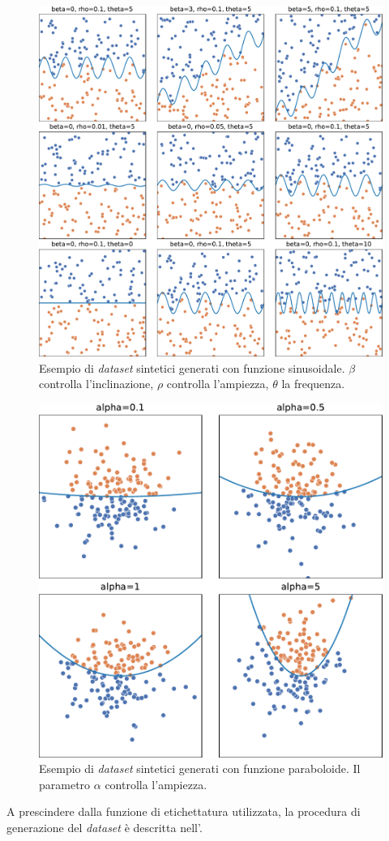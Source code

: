 \begin{figure}
    \centering
    \includegraphics[width=.7\linewidth]{img/sinusoid_dataset_param_influence.pdf}
    \caption[Esempio di \emph{dataset} sintetici generati con funzione sinusoidale.]{Esempio di \emph{dataset} sintetici generati con funzione sinusoidale. 
    $\beta$ controlla l'inclinazione, $\rho$ controlla l'ampiezza, $\theta$ la frequenza.}
    \label{fig:sinusoid_dataset}
\end{figure}
\begin{figure}
    \centering
    \includegraphics[width=.5\linewidth]{img/pacman_dataset_param_influence.pdf}
    \caption[Esempio di \emph{dataset} sintetici generati con funzione paraboloide.]{Esempio di \emph{dataset} sintetici generati con funzione paraboloide. Il parametro $\alpha$ controlla l'ampiezza.}
    \label{fig:pacman_dataset}
\end{figure}
A prescindere dalla funzione di etichettatura utilizzata, la procedura di generazione del \emph{dataset} è descritta nell'.
